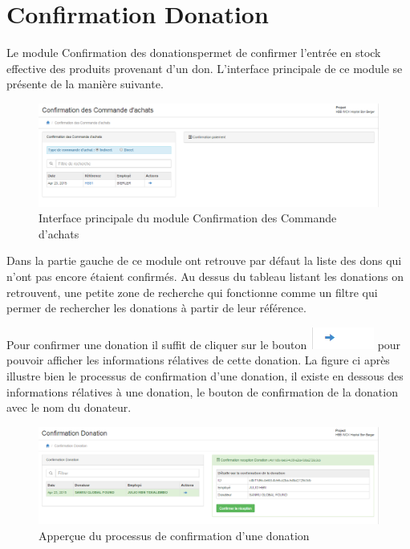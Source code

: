 \documentclass[12pt,a4paper]{report}
\begin{document}
\newpage
\section{Confirmation Donation}
Le module Confirmation des donationspermet de confirmer l'entrée en stock effective des produits provenant d'un don. L'interface principale de ce module se présente de la manière suivante.

\begin{figure}[h]
\begin{center}
\includegraphics[width=12cm]{pic/ConfPaieAchat.png}
\end{center}
\caption{Interface principale du module Confirmation des Commande d'achats}
\label{Interface principale du module Confirmation des Commande d'achats}
\end{figure}  

Dans la partie gauche de ce module ont retrouve par défaut la liste des dons qui n'ont pas encore étaient confirmés. Au dessus du tableau listant les donations on retrouvent, une petite zone de recherche qui fonctionne comme un filtre qui permer de rechercher les donations à partir de leur référence.

Pour confirmer une donation il suffit de cliquer sur le bouton \includegraphics[scale=0.7]{pic/BlueArrow.png} pour pouvoir afficher les informations rélatives de cette donation. La figure ci après illustre bien le processus de confirmation d'une donation, il existe en dessous des informations rélatives à une donation, le bouton de confirmation  de la donation avec le nom du donateur.

\begin{figure}[h]
\begin{center}
\includegraphics[width=12cm]{pic/ConfirDonation.png}
\end{center}
\caption{Apperçue du processus de confirmation d'une donation}
\label{Apperçue du processus de confirmation d'une donation}
\end{figure} 
\end{document}
